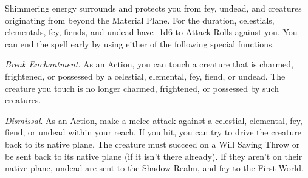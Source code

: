\documentclass[a4paper,twoside,openany]{book}
\begin{document}
Shimmering energy surrounds and protects you from fey, undead, and creatures originating from beyond the Material Plane. For the duration, celestials, elementals, fey, fiends, and undead have -1d6 to Attack Rolls against you. You can end the spell early by using either of the following special functions.

\emph{Break Enchantment}. As an Action, you can touch a creature that is charmed, frightened, or possessed by a celestial, elemental, fey, fiend, or undead. The creature you touch is no longer charmed, frightened, or possessed by such creatures.

\emph{Dismissal}. As an Action, make a melee attack against a celestial, elemental, fey, fiend, or undead within your reach. If you hit, you can try to drive the creature back to its native plane. The creature must succeed on a Will Saving Throw or be sent back to its native plane (if it isn't there already). If they aren't on their native plane, undead are sent to the Shadow Realm, and fey to the First World.



{\scriptsize\printindex}
\end{document}

